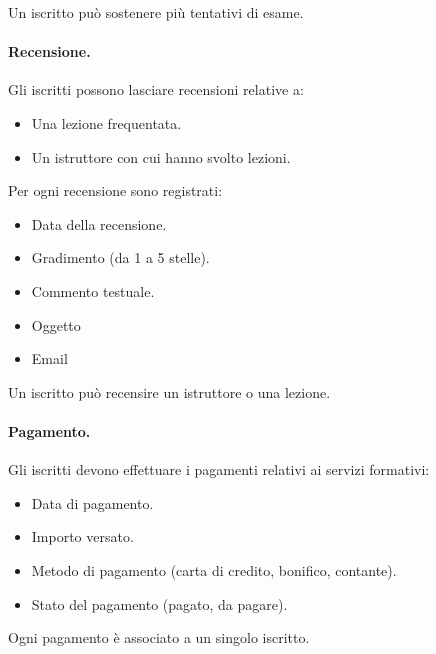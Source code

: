\documentclass[10pt,twoside]{article}
\begin{document}
{    Un iscritto può sostenere più tentativi di esame. 


    \paragraph{Recensione.}
    Gli iscritti possono lasciare recensioni relative a:

    \begin{itemize}
        \item Una lezione frequentata.
        \item Un istruttore con cui hanno svolto lezioni.
    \end{itemize}

    Per ogni recensione sono registrati:

    \begin{itemize}
        \item Data della recensione.
        \item Gradimento (da 1 a 5 stelle).
        \item Commento testuale.
        \item Oggetto 
        \item Email
    \end{itemize}

    Un iscritto può recensire un istruttore o una lezione.


    \paragraph{Pagamento.}
    Gli iscritti devono effettuare i pagamenti relativi ai servizi formativi:

    \begin{itemize}
        \item Data di pagamento.
        \item Importo versato.
        \item Metodo di pagamento (carta di credito, bonifico, contante).
        \item Stato del pagamento (pagato, da pagare).
    \end{itemize}

    Ogni pagamento è associato a un singolo iscritto.

}
\end{document}
